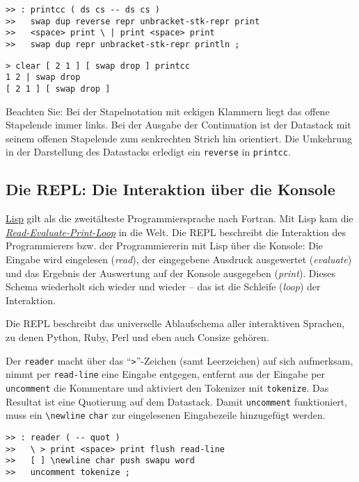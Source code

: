 \begin{verbatim}  
>> : printcc ( ds cs -- ds cs )
>>   swap dup reverse repr unbracket-stk-repr print
>>   <space> print \ | print <space> print
>>   swap dup repr unbracket-stk-repr println ;
\end{verbatim}
  
\begin{verbatim}
> clear [ 2 1 ] [ swap drop ] printcc
1 2 | swap drop
[ 2 1 ] [ swap drop ]
\end{verbatim}

Beachten Sie: Bei der Stapelnotation mit eckigen Klammern liegt das offene Stapelende immer links. Bei der Ausgabe der Continuation ist der Datastack mit seinem offenen Stapelende zum senkrechten Strich hin orientiert. Die Umkehrung in der Darstellung des Datastacks erledigt ein \verb|reverse| in \verb|printcc|.

\subsection{Die REPL: Die Interaktion über die Konsole}

\href{http://de.wikipedia.org/wiki/Lisp}{Lisp} gilt als die zweitälteste Programmiersprache nach Fortran. Mit Lisp kam die \href{http://en.wikipedia.org/wiki/Read\%E2\%80\%93eval\%E2\%80\%93print_loop}{\emph{Read-Evaluate-Print-Loop}} in die Welt. Die REPL beschreibt die Interaktion des Programmierers bzw. der Programmiererin mit Lisp über die Konsole: Die Eingabe wird eingelesen (\emph{read}), der eingegebene Ausdruck ausgewertet (\emph{evaluate}) und das Ergebnis der Auswertung auf der Konsole ausgegeben (\emph{print}). Dieses Schema wiederholt sich wieder und wieder -- das ist die Schleife (\emph{loop}) der Interaktion.

Die REPL beschreibt das universelle Ablaufschema aller interaktiven Sprachen, zu denen Python, Ruby, Perl und eben auch Consize gehören.

Der \verb|reader| macht über das "`\verb|>|"'-Zeichen (samt Leerzeichen) auf sich aufmerksam, nimmt per \verb|read-line| eine Eingabe entgegen, entfernt aus der Eingabe per \verb|uncomment| die Kommentare und aktiviert den Tokenizer mit \verb|tokenize|. Das Resultat ist eine Quotierung auf dem Datastack. Damit \verb|uncomment| funktioniert, muss ein \verb|\newline| \verb|char| zur eingelesenen Eingabezeile hinzugefügt werden.

\begin{verbatim}  
>> : reader ( -- quot )
>>   \ > print <space> print flush read-line
>>   [ ] \newline char push swapu word
>>   uncomment tokenize ;
\end{verbatim}

